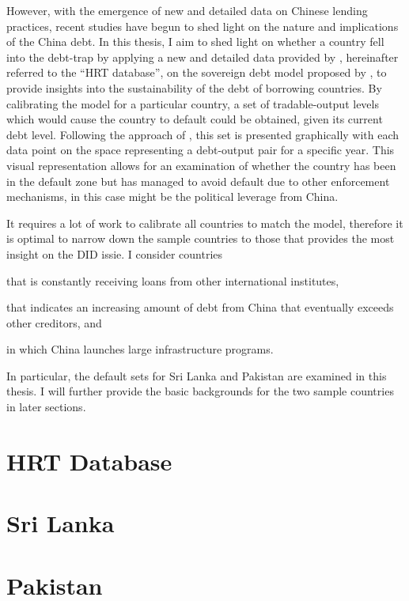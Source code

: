 However, with the emergence of new and detailed data on Chinese lending practices, recent studies have begun to shed light on the nature and implications of the China debt.
In this thesis, I aim to shed light on whether a country fell into the debt-trap by applying a new and detailed data provided by \citet*{Horn-Reinhart-Trebesch-21}, hereinafter referred to the ``HRT database'', on the sovereign debt model proposed by \citet*{Na-18}, to provide insights into the sustainability of the debt of borrowing countries.
By calibrating the model for a particular country, a set of tradable-output levels which would cause the country to default could be obtained, given its current debt level. Following the approach of \citet{Hinrichsen_2020-chapter4}, this set is presented graphically with each data point on the space representing a debt-output pair for a specific year. This visual representation allows for an examination of whether the country has been in the default zone but has managed to avoid default due to other enforcement mechanisms, in this case might be the political leverage from China.

It requires a lot of work to calibrate all countries to match the model, therefore it is optimal to narrow down the sample countries to those that provides the most insight on the DID issie. I consider countries
\begin{enumerate*}
    \item that is constantly receiving loans from other international institutes,
    \item that indicates an increasing amount of debt from China that eventually exceeds other creditors, and
    \item in which China launches large infrastructure programs.
\end{enumerate*}
In particular, the default sets for Sri Lanka and Pakistan are examined in this thesis. I will further provide the basic backgrounds for the two sample countries in later sections.

\section{HRT Database}


\section*{Sri Lanka}

\section*{Pakistan}

